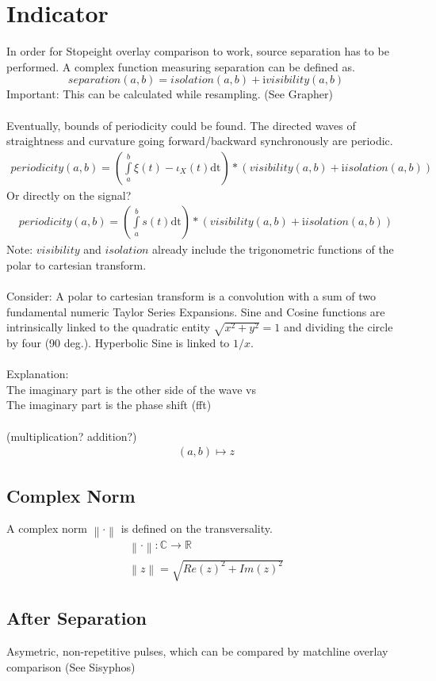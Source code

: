 \documentclass{report}
\newcommand\norm[1]{\left\lVert#1\right\rVert}
\begin{document}
\section{Indicator}
In order for Stopeight overlay comparison to work, source separation has to be performed. A complex function measuring separation can be defined as.
\begin{equation}
separation(a,b) = isolation(a,b) + \mathrm{i} visibility(a,b)
\end{equation}
Important: This can be calculated while resampling. (See Grapher)\\\\
Eventually, bounds of periodicity could be found. The directed waves of straightness and curvature going forward/backward synchronously are periodic.
\begin{align}
periodicity(a,b) =  (\int \limits _{a}^{b} \xi(t)-\iota_{X}(t) \mathrm{dt}) *(visibility(a,b) +\mathrm{i} isolation(a,b))
\end{align}
Or directly on the signal?
\begin{align}
periodicity(a,b) =  (\int \limits _{a}^{b} s(t) \mathrm{dt}) *(visibility(a,b) +\mathrm{i} isolation(a,b))
\end{align}
Note: $visibility$ and $isolation$ already include the trigonometric functions of the polar to cartesian transform.\\\\
Consider: A polar to cartesian transform is a convolution with a sum of two fundamental numeric Taylor Series Expansions. Sine and Cosine functions are intrinsically linked to the quadratic entity $\sqrt{x^2 + y^2} =1$ and dividing the circle by four (90 deg.). Hyperbolic Sine is linked to $1/x$.\\\\
Explanation:\\
The imaginary part is the other side of the wave vs\\
The imaginary part is the phase shift (fft)\\\\
(multiplication? addition?)
\begin{align}
(a,b) \mapsto z
\end{align}

\subsection*{Complex Norm}
A complex norm $\norm{\cdot}$ is defined on the transversality.
\begin{align}
\norm{\cdot} : \mathbb{C} \rightarrow \mathbb{R}\\
\norm{z} = \sqrt{Re(z)^2+Im(z)^2}
\end{align}

\subsection*{After Separation}
Asymetric, non-repetitive pulses, which can be compared by matchline overlay comparison (See Sisyphos)

\iffalse
\printbibliography
\fi
{}

\end{document}

